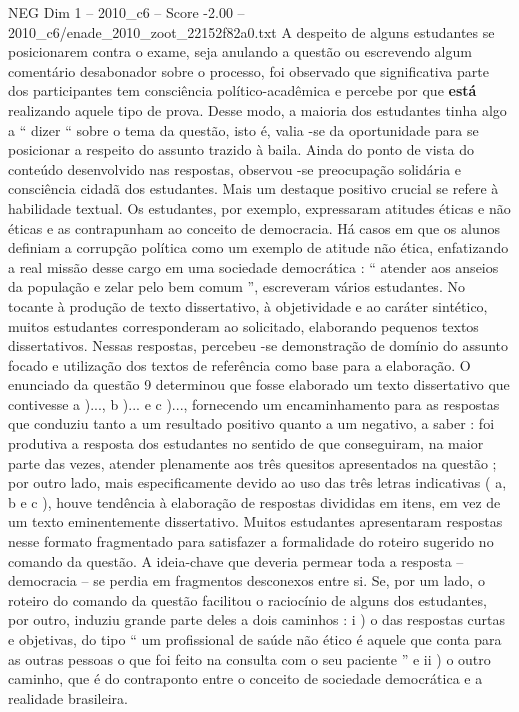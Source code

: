 \begin{textsample}{NEG Dim 1 – 2010\_c6 – Score -2.00 – 2010\_c6/enade\_2010\_zoot\_22152f82a0.txt}
A despeito de alguns estudantes se posicionarem contra o exame, seja anulando a questão ou escrevendo algum comentário desabonador sobre o processo, foi observado que significativa parte dos participantes tem consciência político-acadêmica e percebe por que \textbf{está} realizando aquele tipo de prova.
Desse modo, a maioria dos estudantes tinha algo a “ dizer “ sobre o tema da questão, isto é, valia -se da oportunidade para se posicionar a respeito do assunto trazido à baila.
Ainda do ponto de vista do conteúdo desenvolvido nas respostas, observou -se preocupação solidária e consciência cidadã dos estudantes.
Mais um destaque positivo crucial se refere à habilidade textual.
Os estudantes, por exemplo, expressaram atitudes éticas e não éticas e as contrapunham ao conceito de democracia.
Há casos em que os alunos definiam a corrupção política como um exemplo de atitude não ética, enfatizando a real missão desse cargo em uma sociedade democrática : “ atender aos anseios da população e zelar pelo bem comum ”, escreveram vários estudantes.
No tocante à produção de texto dissertativo, à objetividade e ao caráter sintético, muitos estudantes corresponderam ao solicitado, elaborando pequenos textos dissertativos.
Nessas respostas, percebeu -se demonstração de domínio do assunto focado e utilização dos textos de referência como base para a elaboração.
O enunciado da questão 9 determinou que fosse elaborado um texto dissertativo que contivesse a )..., b )... e c )..., fornecendo um encaminhamento para as respostas que conduziu tanto a um resultado positivo quanto a um negativo, a saber : foi produtiva a resposta dos estudantes no sentido de que conseguiram, na maior parte das vezes, atender plenamente aos três quesitos apresentados na questão ; por outro lado, mais especificamente devido ao uso das três letras indicativas ( a, b e c ), houve tendência à elaboração de respostas divididas em itens, em vez de um texto eminentemente dissertativo.
Muitos estudantes apresentaram respostas nesse formato fragmentado para satisfazer a formalidade do roteiro sugerido no comando da questão.
A ideia-chave que deveria permear toda a resposta – democracia – se perdia em fragmentos desconexos entre si.
Se, por um lado, o roteiro do comando da questão facilitou o raciocínio de alguns dos estudantes, por outro, induziu grande parte deles a dois caminhos : i ) o das respostas curtas e objetivas, do tipo “ um profissional de saúde não ético é aquele que conta para as outras pessoas o que foi feito na consulta com o seu paciente ” e ii ) o outro caminho, que é do contraponto entre o conceito de sociedade democrática e a realidade brasileira.

\end{textsample}
